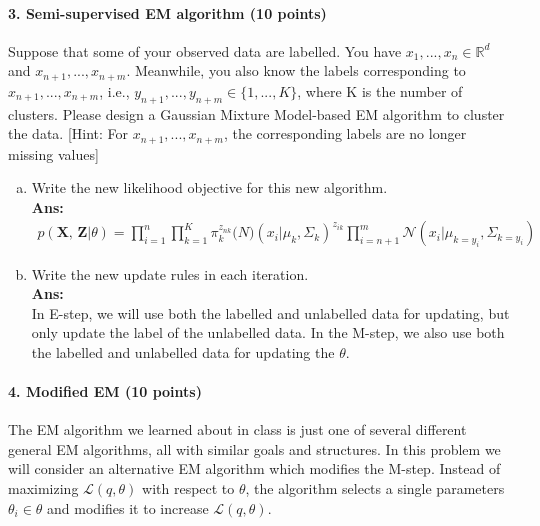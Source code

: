 \documentclass[11pt]{article}
\begin{document}
\paragraph{3. Semi-supervised EM algorithm (10 points)}
Suppose that some of your observed data are labelled. You have $x_1,...,x_n\in\mathbb{R}^{d}$ and $x_{n+1},...,x_{n+m}$. Meanwhile, you also know the labels corresponding to $x_{n+1},...,x_{n+m}$, i.e., $y_{n+1},...,y_{n+m}\in\{1,...,K\}$, where K is the number of clusters. Please design a Gaussian Mixture Model-based EM algorithm to cluster the data. [Hint: For $x_{n+1},...,x_{n+m}$, the corresponding labels are no longer missing values]
\begin{enumerate}[(a)]
\item Write the new likelihood objective for this new algorithm.\\
\textbf{Ans:}
\begin{eqnarray}
p(\textbf{X, Z}|\theta) = \prod_{i=1}^{n}\prod_{k=1}^{K}\pi_k^{z_{nk}}\mathcal(N)(x_i|\mu_k, \Sigma_k)^{z_{ik}}\prod_{i=n+1}^{m}\mathcal{N}(x_i|\mu_{k=y_i}, \Sigma_{k=y_i})
\nonumber
\end{eqnarray}

\item Write the new update rules in each iteration.\\
\textbf{Ans:}\\
In E-step, we will use both the labelled and unlabelled data for updating, but only update the label of the unlabelled data. In the M-step, we also use both the labelled and unlabelled data for updating the $\theta$.


\end{enumerate}

\paragraph{4. Modified EM (10 points)}
The EM algorithm we learned about in class is just one of several different general EM algorithms, all with similar goals and structures.  In this problem we will consider an alternative EM algorithm which modifies the M-step. Instead of maximizing $\mathcal{L}(q,\theta)$ with respect to $\theta$, the algorithm selects a single parameters $\theta_i \in \theta$ and modifies
it to increase $\mathcal{L}(q,\theta)$.
\end{document}
